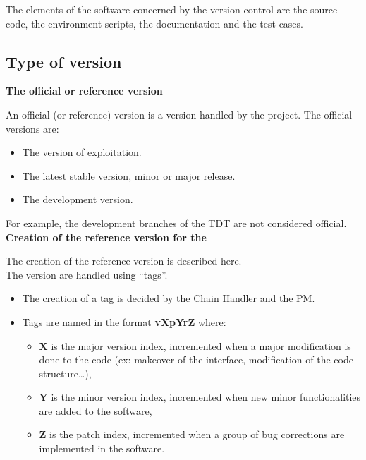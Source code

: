 The elements of the \telemacsystem{} software concerned by the version control
are the source code, the environment scripts, the documentation and the test
cases.

\subsection{Type of version}

\textbf{The \telemacsystem{} official or reference version}

An official (or reference) version is a version handled by the \telemacsystem{}
project. The official versions are:
\begin{itemize}
\item The version of exploitation.
\item The latest stable version, minor or major release.
\item The development version.
\end{itemize}

For example, the development branches of the TDT are not considered official.\\

\textbf{Creation of the reference version for the \telemacsystem{}}

The creation of the reference version is described here.\\

The \telemacsystem{} version are handled using ``tags''.
\begin{itemize}
\item The creation of a tag is decided by the Chain Handler and the PM\@.
\item Tags are named in the format \textbf{vXpYrZ} where:
  \begin{itemize}
  \item \textbf{X} is the major version index, incremented when a major
    modification is done to the code (ex: makeover of the interface,
    modification of the code structure\ldots),
  \item \textbf{Y} is the minor version index, incremented when new minor
    functionalities are added to the software,
  \item \textbf{Z} is the patch index, incremented when a group of bug
    corrections are implemented in the software.
  \end{itemize}
\end{itemize}

